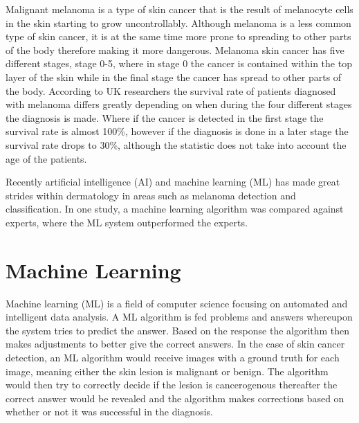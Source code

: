 \documentclass{kththesis}
\begin{document}
Malignant melanoma is a type of skin cancer that is the result of melano\-cyte cells in the skin starting to grow uncontrollably.
Although melanoma is a less common type of skin cancer, it is at the same time more prone to spreading to other parts of the body therefore making it more dangerous. %
Melanoma skin cancer has five different stages, stage 0-5, where in stage 0 the cancer is contained within the top layer of the skin while in the final stage %
the cancer has spread to other parts of the body. %
According to UK researchers the survival rate of patients diagnosed with melanoma differs greatly depending on when during the four different stages the diagnosis is made.%
Where if the cancer is detected in the first stage the survival rate is almost 100\%, however if the diagnosis is done in a later stage the survival rate drops to 30\%, although the statistic does not take into account the age of the patients. %

Recently artificial intelligence (AI) and machine learning (ML) has made great strides within dermatology in areas such as melanoma detection and classification. In one study, a machine learning algorithm was compared against experts, where the ML system outperformed the experts.%


\section{Machine Learning}


Machine learning (ML) is a field of computer science focusing on automated and intelligent data analysis. A ML algorithm is fed problems and answers whereupon the system tries to predict the answer. Based on the response the algorithm then makes adjustments to better give the correct answers. %
In the case of skin cancer detection, an ML algorithm would receive images with a ground truth for each image, meaning either the skin lesion is malignant or benign. The algorithm would then try to correctly decide if the lesion is cancerogenous thereafter the correct answer would be revealed and the algorithm makes corrections based on whether or not it was successful in the diagnosis.
\end{document}
